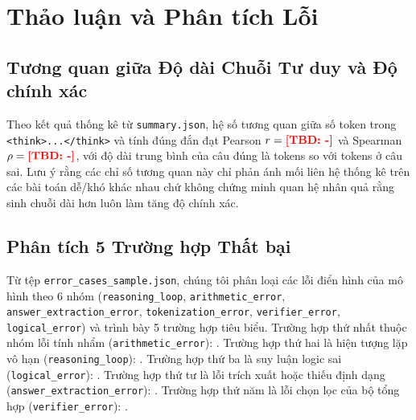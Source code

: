 \section{Thảo luận và Phân tích Lỗi}

\subsection{Tương quan giữa Độ dài Chuỗi Tư duy và Độ chính xác}
Theo kết quả thống kê từ \texttt{summary.json}, hệ số tương quan giữa số token trong \texttt{<think>...</think>} và tính đúng đắn đạt Pearson $r = \textcolor{red}{\textbf{[TBD: -]}}$ và Spearman $\rho = \textcolor{red}{\textbf{[TBD: -]}}$, với độ dài trung bình của câu đúng là \tbd{-} tokens so với \tbd{-} tokens ở câu sai. Lưu ý rằng các chỉ số tương quan này chỉ phản ánh mối liên hệ thống kê trên các bài toán dễ/khó khác nhau chứ không chứng minh quan hệ nhân quả rằng sinh chuỗi dài hơn luôn làm tăng độ chính xác.

\subsection{Phân tích 5 Trường hợp Thất bại}
Từ tệp \texttt{error\_cases\_sample.json}, chúng tôi phân loại các lỗi điển hình của mô hình theo 6 nhóm (\texttt{reasoning\_loop}, \texttt{arithmetic\_error}, \texttt{answer\_extraction\_error}, \texttt{tokenization\_error}, \texttt{verifier\_error}, \texttt{logical\_error}) và trình bày 5 trường hợp tiêu biểu. Trường hợp thứ nhất thuộc nhóm lỗi tính nhẩm (\texttt{arithmetic\_error}): . Trường hợp thứ hai là hiện tượng lặp vô hạn (\texttt{reasoning\_loop}): . Trường hợp thứ ba là suy luận logic sai (\texttt{logical\_error}): . Trường hợp thứ tư là lỗi trích xuất hoặc thiếu định dạng (\texttt{answer\_extraction\_error}): . Trường hợp thứ năm là lỗi chọn lọc của bộ tổng hợp (\texttt{verifier\_error}): .

